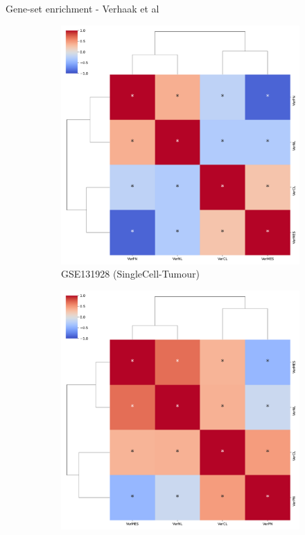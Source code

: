 \documentclass[aspectratio=169,9pt]{beamer}
\begin{document}
    \begin{frame}{Gene-set enrichment - Verhaak et al}
        \begin{adjustwidth}{-5cm}{-5cm}
            \centering
            \begin{figure}\ContinuedFloat
                \centering
                \begin{subfigure}[c]{0.48\textwidth}
                    \centering
                    \includegraphics[width=\textwidth]{AUCell_GSM3828672_corrplot_Ver}
                    \caption{GSE131928 (SingleCell-Tumour)}
                \end{subfigure}
                \begin{subfigure}[c]{0.48\textwidth}
                    \centering
                    \includegraphics[width=\textwidth]{AUCell_mgg23_corrplot_Ver}

\end{subfigure}
\end{figure}
\end{adjustwidth}
\end{frame}
\end{document}
